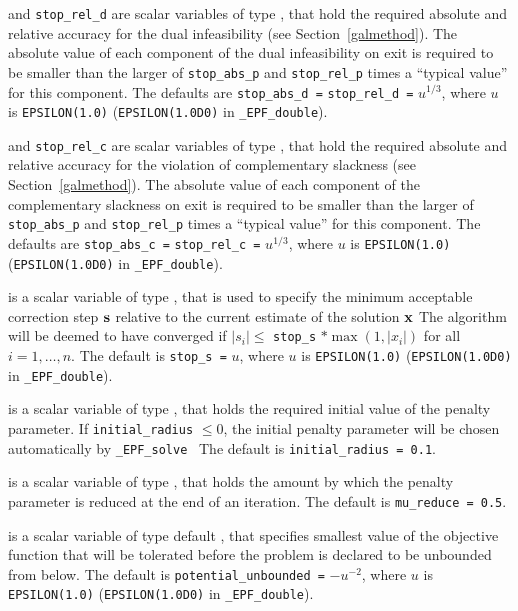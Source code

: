 \documentclass{galahad}
\newcommand{\packagename}{EPF}
\newcommand{\fullpackagename}{\libraryname\_\packagename}
\newcommand{\solver}{{\tt \fullpackagename\_solve}}
\begin{document}
\begin{description}
 and {\tt stop\_rel\_d}
are scalar variables of type \realdp, that hold the
required absolute and relative accuracy for the dual infeasibility
(see Section~\ref{galmethod}).
The absolute value of each component of the dual infeasibility
on exit is required to be smaller than the larger of {\tt stop\_abs\_p} and
{\tt stop\_rel\_p} times a ``typical value'' for this component.
The defaults are {\tt stop\_abs\_d =} {\tt stop\_rel\_d =} $u^{1/3}$,
where $u$ is {\tt EPSILON(1.0)} ({\tt EPSILON(1.0D0)} in
{\tt \fullpackagename\_double}).

 and {\tt stop\_rel\_c}
are scalar variables of type \realdp, that hold the required absolute and 
relative accuracy for the violation of complementary slackness
(see Section~\ref{galmethod}).
The absolute value of each component of the complementary slackness
on exit is required to be smaller than the larger of {\tt stop\_abs\_p} and
{\tt stop\_rel\_p} times a ``typical value'' for this component.
The defaults are {\tt stop\_abs\_c =} {\tt stop\_rel\_c =} $u^{1/3}$,
where $u$ is {\tt EPSILON(1.0)} ({\tt EPSILON(1.0D0)} in
{\tt \fullpackagename\_double}).

 is a scalar variable of type \realdp,
that is used to specify the minimum acceptable correction step ${\mathbf{s}}$
relative to the current estimate of the solution ${\mathbf{x}}$
The algorithm will be deemed to have converged if $|s_i| \leq$
{\tt stop\_s} $\ast \max( 1, |x_i|)$ for all $i = 1, \ldots, n$.
The default is {\tt stop\_s =} $u$,
where $u$ is {\tt EPSILON(1.0)} ({\tt EPSILON(1.0D0)} in
{\tt \fullpackagename\_double}).

 is a scalar variable of type \realdp, that holds
the required initial value of the penalty parameter. If
{\tt initial\_radius} $\leq 0$, the initial penalty parameter will be 
chosen automatically by \solver\
The default is {\tt initial\_radius = 0.1}.

 is a scalar variable of type \realdp, that holds
the amount by which the penalty parameter is reduced at the end of 
an iteration.
The default is {\tt mu\_reduce = 0.5}.

 is a scalar variable of type default \realdp, that 
specifies smallest
value of the objective function that will be tolerated before the problem
is declared to be unbounded from below.
The default is {\tt potential\_u\-nbounded =} $-u^{-2}$,
where $u$ is {\tt EPSILON(1.0)} ({\tt EPSILON(1.0D0)} in
{\tt \fullpackagename\_double}).


\end{description}
\end{document}
